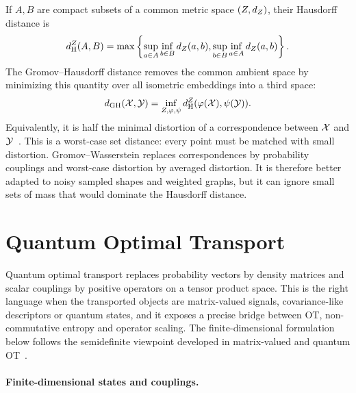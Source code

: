If $A,B$ are compact subsets of a common metric space $(Z,d_Z)$, their Hausdorff distance is
\[
	d_{\mathrm H}^{Z}(A,B)
	=
	\max\left\{
		\sup_{a\in A}\inf_{b\in B}d_Z(a,b),
		\sup_{b\in B}\inf_{a\in A}d_Z(a,b)
	\right\}.
\]
The Gromov--Hausdorff distance removes the common ambient space by minimizing this quantity over all isometric embeddings into a third space:
\[
	d_{\mathrm{GH}}(\mathcal{X},\mathcal{Y})
	=
	\inf_{Z,\varphi,\psi}
	d_{\mathrm H}^{Z}(\varphi(\mathcal{X}),\psi(\mathcal{Y})).
\]
Equivalently, it is half the minimal distortion of a correspondence between $\mathcal{X}$ and $\mathcal{Y}$~\cite{gromov-2001,memoli-2007}. This is a worst-case set distance: every point must be matched with small distortion. Gromov--Wasserstein replaces correspondences by probability couplings and worst-case distortion by averaged distortion. It is therefore better adapted to noisy sampled shapes and weighted graphs, but it can ignore small sets of mass that would dominate the Hausdorff distance.

\section{Quantum Optimal Transport}
\label{sec-quantum-ot}

Quantum optimal transport replaces probability vectors by density matrices and scalar couplings by positive operators on a tensor product space. This is the right language when the transported objects are matrix-valued signals, covariance-like descriptors or quantum states, and it exposes a precise bridge between OT, non-commutative entropy and operator scaling. The finite-dimensional formulation below follows the semidefinite viewpoint developed in matrix-valued and quantum OT~\cite{Ning2014metrics,Chen2016,ChenGangbo17,2016-peyre-qot,caglioti2019quantum,chakrabarti2019quantum}.

\paragraph{Finite-dimensional states and couplings.}

